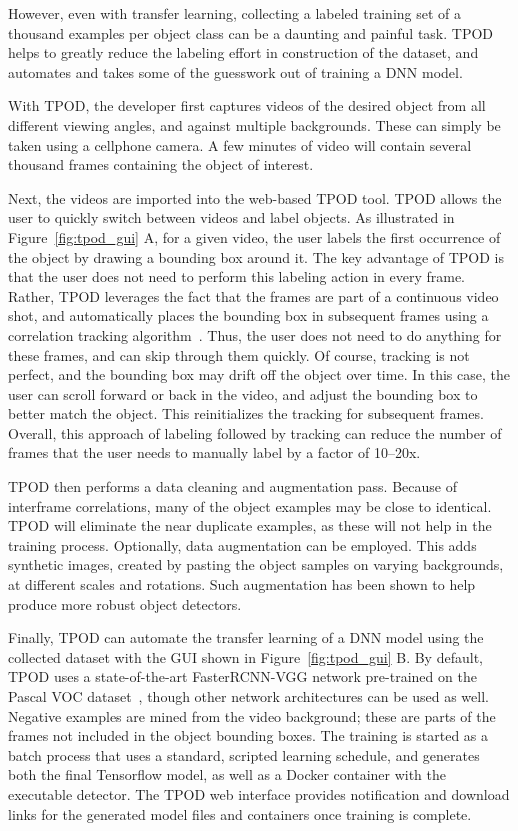 However, even with transfer learning, collecting a labeled training set of a
thousand examples per object class can be a daunting and painful task. TPOD
helps to greatly reduce the labeling effort in construction of the dataset, and
automates and takes some of the guesswork out of training a DNN model.

With TPOD, the developer first captures videos of the desired object from
all different viewing angles, and against multiple backgrounds.  These can
simply be taken using a cellphone camera.  A few minutes of video will
contain several thousand frames containing the object of interest.

Next, the videos are imported into the web-based TPOD tool.  TPOD allows the
user to quickly switch between videos and label objects.  As illustrated in
Figure~\ref{fig:tpod_gui} A, for a given video, the user labels the first
occurrence of the object by drawing a bounding box around it. The key advantage
of TPOD is that the user does not need to perform this labeling action in every
frame.  Rather, TPOD leverages the fact that the frames are part of a continuous
video shot, and automatically places the bounding box in subsequent frames using
a correlation tracking algorithm~\cite{danelljan2014accurate}. Thus, the user
does not need to do anything for these frames, and can skip through them
quickly.  Of course, tracking is not perfect, and the bounding box may drift off
the object over time. In this case, the user can scroll forward or back in the
video, and adjust the bounding box to better match the object.  This
reinitializes the tracking for subsequent frames. Overall, this approach of
labeling followed by tracking can reduce the number of frames that the user
needs to manually label by a factor of 10--20x.


TPOD then performs a data cleaning and augmentation pass.  Because of interframe
correlations, many of the object examples may be close to identical.  TPOD will
eliminate the near duplicate examples, as these will not help in the training
process.  Optionally, data augmentation can be employed.  This adds synthetic
images, created by pasting the object samples on varying backgrounds, at
different scales and rotations.  Such augmentation has been shown to help
produce more robust object detectors.

Finally, TPOD can automate the transfer learning of a DNN model using the
collected dataset with the GUI shown in Figure~\ref{fig:tpod_gui} B.  By
default, TPOD uses a state-of-the-art FasterRCNN-VGG network pre-trained on the
Pascal VOC dataset~\cite{Everingham15}, though other network architectures can
be used as well. Negative examples are mined  from the video background; these
are parts of the frames not included in the object bounding boxes.  The training
is started as a batch process that uses a standard, scripted learning schedule,
and generates both the final Tensorflow model, as well as a Docker container
with the executable detector.  The TPOD web interface provides notification and
download links for the generated model files and containers once training is
complete.

